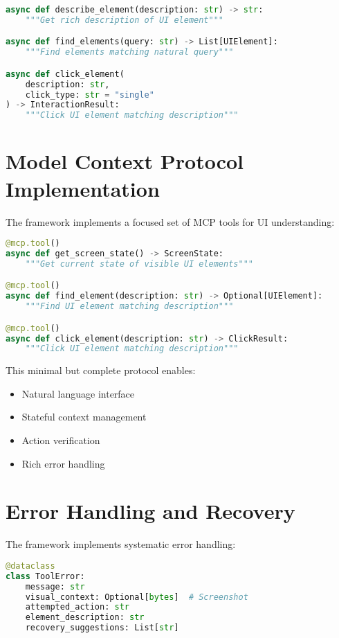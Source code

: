 \documentclass{article}
\begin{document}
\begin{lstlisting}[language=Python]
async def describe_element(description: str) -> str:
    """Get rich description of UI element"""

async def find_elements(query: str) -> List[UIElement]:
    """Find elements matching natural query"""

async def click_element(
    description: str,
    click_type: str = "single"
) -> InteractionResult:
    """Click UI element matching description"""
\end{lstlisting}

\section{Model Context Protocol Implementation}
The framework implements a focused set of MCP tools for UI understanding:

\begin{lstlisting}[language=Python]
@mcp.tool()
async def get_screen_state() -> ScreenState:
    """Get current state of visible UI elements"""

@mcp.tool()
async def find_element(description: str) -> Optional[UIElement]:
    """Find UI element matching description"""

@mcp.tool()
async def click_element(description: str) -> ClickResult:
    """Click UI element matching description"""
\end{lstlisting}

This minimal but complete protocol enables:
\begin{itemize}
    \item Natural language interface
    \item Stateful context management
    \item Action verification
    \item Rich error handling
\end{itemize}

\section{Error Handling and Recovery}
The framework implements systematic error handling:

\begin{lstlisting}[language=Python]
@dataclass
class ToolError:
    message: str
    visual_context: Optional[bytes]  # Screenshot
    attempted_action: str
    element_description: str
    recovery_suggestions: List[str]
\end{lstlisting}
\end{document}
